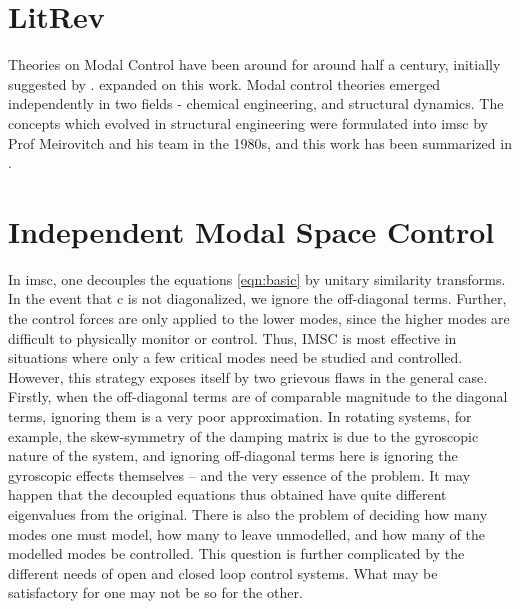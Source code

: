 \begin{multicols}{2}
\section{LitRev}
\label{chap:lit_rev}
Theories on Modal Control have been around for around half a century, initially 
suggested by \citet{Rosen1962}. \citet{Simon1968316} expanded on this work. 
Modal control theories emerged independently in two fields - chemical engineering,
and structural dynamics. The concepts which evolved in structural engineering 
were formulated into \gls{imsc} by Prof Meirovitch and his team in the 1980s, and 
this work has been summarized in \citet{meirovitch1990dynamics}.

\section{Independent Modal Space Control}
\label{sec:lit_imsc}
In \gls{imsc}, one decouples the equations \eqref{eqn:basic} by unitary 
similarity transforms. In the event that \gls{c} is not diagonalized,
we ignore the off-diagonal terms. Further, the control forces are only applied 
to the lower modes, since the higher modes are difficult to physically monitor 
or control. Thus, IMSC is most effective in situations where only a few critical 
modes need be studied and controlled. However, this strategy exposes itself by 
two grievous flaws in the general case. Firstly, when the off-diagonal terms are 
of comparable magnitude to the diagonal terms, ignoring them is a very poor 
approximation. In rotating systems, for example, the skew-symmetry of the 
damping matrix is due to the gyroscopic nature of the system, and ignoring
off-diagonal terms here is ignoring the gyroscopic effects themselves -- and
the very essence of the problem. It may happen that the decoupled equations 
thus obtained have quite different eigenvalues from the original. There is 
also the problem of deciding how many modes one must model, how many to leave 
unmodelled, and how many of the modelled modes be controlled. This question is 
further complicated by the different needs of open and closed loop control 
systems. What may be satisfactory for one may not be so for the other.


\end{multicols}
